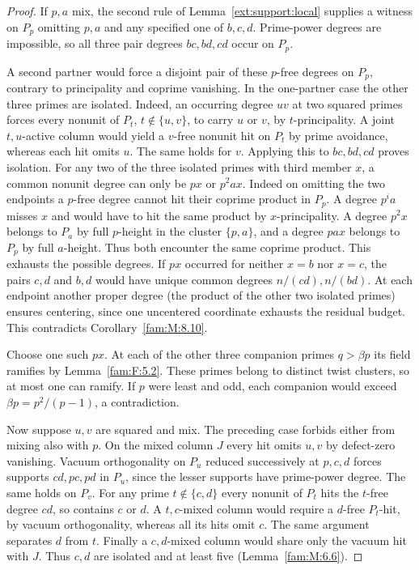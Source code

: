 \documentclass[11pt,a4paper]{article}
\numberwithin{equation}{section}
\theoremstyle{remark}
\begin{document}
\begin{proof}

If $p,a$ mix, the second rule of Lemma~\ref{ext:support:local} supplies
a witness on $P_p$ omitting $p,a$ and any specified one of $b,c,d$.
Prime-power degrees are impossible, so all three pair degrees
$bc,bd,cd$ occur on $P_p$.

A second partner would force a disjoint
pair of these $p$-free degrees on $P_p$, contrary to principality
and coprime vanishing.
In the one-partner case the other three primes are isolated. Indeed, an occurring degree $uv$ at two squared primes forces every nonunit of $P_t$, $t\notin\{u,v\}$, to carry $u$ or $v$, by $t$-principality. A joint $t,u$-active column would yield a $v$-free nonunit hit on $P_t$ by prime avoidance, whereas each hit omits $u$. The same holds for $v$. Applying this to $bc,bd,cd$ proves isolation.
For any two of the three isolated primes with third member $x$, a common nonunit degree
can only be $px$ or $p^2ax$. Indeed on omitting the two endpoints
a $p$-free degree cannot hit their coprime product in $P_p$.
A degree $p^ia$ misses $x$ and would have to hit the same product
by $x$-principality. A degree $p^2x$ belongs to $P_a$ by full
$p$-height in the cluster $\{p,a\}$, and a degree $pax$ belongs
to $P_p$ by full $a$-height. Thus both encounter the same coprime
product. This exhausts the possible degrees.
If $px$ occurred for neither $x=b$ nor $x=c$, the pairs $c,d$
and $b,d$ would have unique common degrees $n/(cd),n/(bd)$.
At each endpoint another proper degree (the product of the other
two isolated primes) ensures centering, since one uncentered
coordinate exhausts the residual budget. This contradicts
Corollary~\ref{fam:M:8.10}.

Choose one such $px$. At each of the other three companion primes
$q>\beta p$ its field ramifies by Lemma~\ref{fam:F:5.2}.
These primes belong to distinct twist clusters, so at most one can
ramify. If $p$ were least and odd, each companion would exceed
$\beta p=p^2/(p-1)$, a contradiction.

Now suppose $u,v$ are squared and mix. The preceding case forbids
either from mixing also with $p$.
On the mixed column $J$ every hit omits $u,v$ by defect-zero
vanishing. Vacuum orthogonality on $P_u$ reduced successively at
$p,c,d$ forces supports $cd,pc,pd$ in $P_u$, since the lesser
supports have prime-power degree. The same holds on $P_v$.
For any prime $t\notin\{c,d\}$ every nonunit of $P_t$ hits
the $t$-free degree $cd$, so contains $c$ or $d$.
A $t,c$-mixed column would require a $d$-free $P_t$-hit, by
vacuum orthogonality, whereas all its hits omit $c$.
The same argument separates $d$ from $t$. Finally a $c,d$-mixed
column would share only the vacuum hit with $J$. Thus $c,d$
are isolated and at least five (Lemma~\ref{fam:M:6.6}).


\end{proof}
\end{document}
